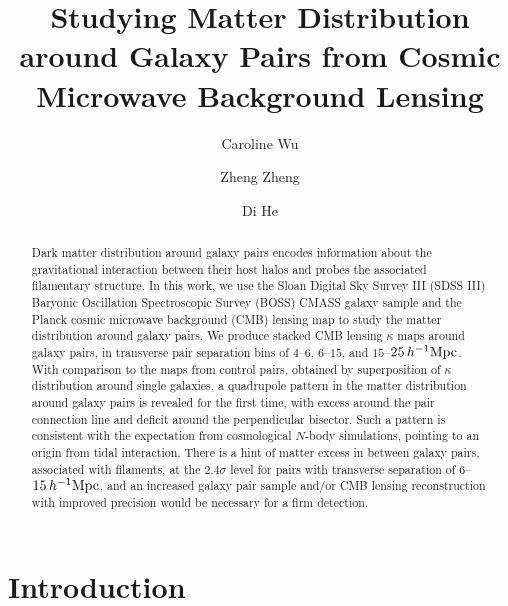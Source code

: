 \documentclass[twocolumn,anonymous,linenumbers]{aastex701}
\newcommand{\hinvMpc}{h^{-1}{\rm Mpc}}
\begin{document}
\title{Studying Matter Distribution around Galaxy Pairs from Cosmic Microwave Background Lensing}

\author[]{Caroline Wu}

\author{Zheng Zheng}

\author{Di He}

\begin{abstract}
Dark matter distribution around galaxy pairs encodes information about the gravitational interaction between their host halos and probes the associated filamentary structure. In this work, we use the Sloan Digital Sky Survey III (SDSS III) Baryonic Oscillation Spectroscopic Survey (BOSS) CMASS galaxy sample and the Planck cosmic microwave background (CMB) lensing map to study the matter distribution around galaxy pairs. We produce stacked CMB lensing $\kappa$ maps around galaxy pairs, in transverse pair separation bins of $4$--$6$, $6$--$15$, and $15$--$25\,\hinvMpc$. With comparison to the maps from control pairs, obtained by superposition of $\kappa$ distribution around single galaxies, a quadrupole pattern in the matter distribution around galaxy pairs is revealed for the first time, with excess around the pair connection line and deficit around the perpendicular bisector. Such a pattern is consistent with the expectation from cosmological $N$-body simulations, pointing to an origin from tidal interaction. There is a hint of matter excess in between galaxy pairs, associated with filaments, at the $2.4\sigma$ level for pairs with transverse separation of $6$--$15\,\hinvMpc$, and an increased galaxy pair sample and/or CMB lensing reconstruction with improved precision would be necessary for a firm detection.

\end{abstract}


\section{Introduction}
\end{document}
